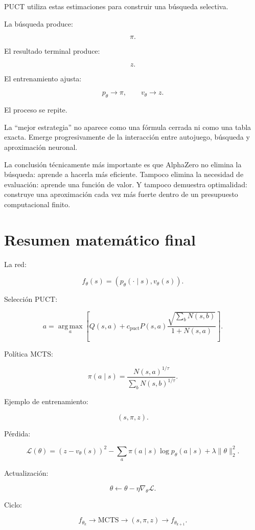 \documentclass[11pt,a4paper]{article}
\newcommand{\argmax}{\operatorname*{arg\,max}}
\begin{document}
PUCT utiliza estas estimaciones para construir una búsqueda selectiva.

La búsqueda produce:

\[
\pi.
\]

El resultado terminal produce:

\[
z.
\]

El entrenamiento ajusta:

\[
p_\theta\rightarrow\pi,
\qquad
v_\theta\rightarrow z.
\]

El proceso se repite.

La ``mejor estrategia'' no aparece como una fórmula cerrada ni como una tabla exacta. Emerge progresivamente de la interacción entre autojuego, búsqueda y aproximación neuronal.

La conclusión técnicamente más importante es que AlphaZero no elimina la búsqueda: aprende a hacerla más eficiente. Tampoco elimina la necesidad de evaluación: aprende una función de valor. Y tampoco demuestra optimalidad: construye una aproximación cada vez más fuerte dentro de un presupuesto computacional finito.

\section{Resumen matemático final}

La red:

\[
f_\theta(s)
=
(p_\theta(\cdot\mid s),v_\theta(s)).
\]

Selección PUCT:

\[
a
=
\argmax_a
\left[
Q(s,a)
+
c_{\mathrm{puct}}P(s,a)
\frac{\sqrt{\sum_b N(s,b)}}
{1+N(s,a)}
\right].
\]

Política MCTS:

\[
\pi(a\mid s)
=
\frac{N(s,a)^{1/\tau}}
{\sum_b N(s,b)^{1/\tau}}.
\]

Ejemplo de entrenamiento:

\[
(s,\pi,z).
\]

Pérdida:

\[
\mathcal{L}(\theta)
=
(z-v_\theta(s))^2
-
\sum_a
\pi(a\mid s)\log p_\theta(a\mid s)
+
\lambda\|\theta\|_2^2.
\]

Actualización:

\[
\theta
\leftarrow
\theta
-
\eta\nabla_\theta\mathcal{L}.
\]

Ciclo:

\[
f_{\theta_k}
\rightarrow
\mathrm{MCTS}
\rightarrow
(s,\pi,z)
\rightarrow
f_{\theta_{k+1}}.
\]

\appendix
\end{document}
